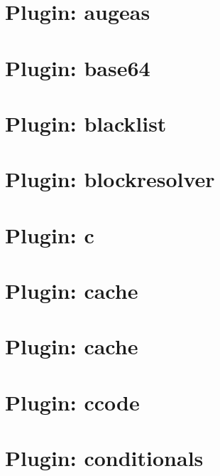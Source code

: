 \let\mypdfximage\pdfximage\def\pdfximage{\immediate\mypdfximage}\documentclass[twoside]{book}
\newcommand{\+}{\discretionary{\mbox{\scriptsize$\hookleftarrow$}}{}{}}
\begin{document}
\chapter{Plugin\+: augeas}
\label{md_src_plugins_augeas_README}

\chapter{Plugin\+: base64}
\label{md_src_plugins_base64_README}

\chapter{Plugin\+: blacklist}
\label{md_src_plugins_blacklist_README}

\chapter{Plugin\+: blockresolver}
\label{md_src_plugins_blockresolver_README}

\chapter{Plugin\+: c}
\label{md_src_plugins_c_README}

\chapter{Plugin\+: cache}
\label{md_src_plugins_cache_README}

\chapter{Plugin\+: cache}
\label{md_src_plugins_cache_shelltests}

\chapter{Plugin\+: ccode}
\label{md_src_plugins_ccode_README}

\chapter{Plugin\+: conditionals}
\label{md_src_plugins_conditionals_README}

\end{document}
